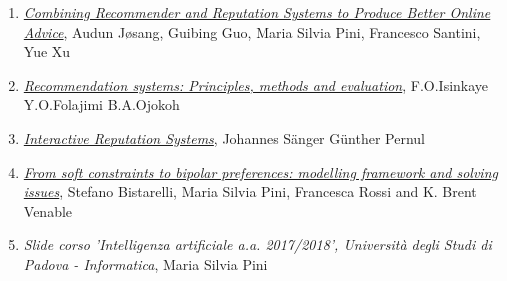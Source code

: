 \documentclass[letterpaper]{article} %
\begin{document}
\begin{enumerate}
	\item
	\href{https://www.researchgate.net/publication/262187804_Combining_Recommender_and_Reputation_Systems_to_Produce_Better_Online_Advice}{\textit{Combining Recommender and Reputation Systems to Produce Better Online Advice}}, Audun Jøsang, Guibing Guo, Maria Silvia Pini, Francesco Santini, Yue Xu
	\item \href{https://www.sciencedirect.com/science/article/pii/S1110866515000341}{\textit{Recommendation systems: Principles, methods and evaluation}}, F.O.Isinkaye Y.O.Folajimi B.A.Ojokoh
	\item 
	\href{https://link.springer.com/article/10.1007/s12599-017-0493-1}{\textit{Interactive Reputation Systems}}, Johannes Sänger Günther Pernul
	\item 
	\href{http://www.math.unipd.it/~frossi/jbip8-jetai.pdf}{\textit{From soft constraints to bipolar preferences: modelling framework and solving issues}}, Stefano Bistarelli, Maria Silvia Pini, Francesca Rossi and K. Brent Venable
	\item
	\textit{Slide corso 'Intelligenza artificiale a.a. 2017/2018', Università degli Studi di Padova - Informatica}, Maria Silvia Pini
\end{enumerate}
\end{document}
